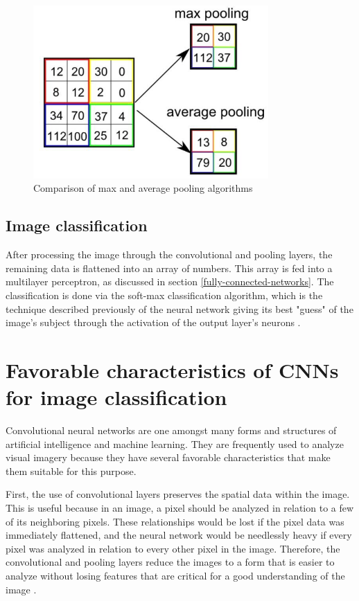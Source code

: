 \documentclass[12pt,a4paper,notitlepage]{article}
\begin{document}
\begin{figure}[htbp]
	\centering
		\includegraphics[width=0.80\textwidth]{images/pooling.jpg}
	\caption{Comparison of max and average pooling algorithms \cite{saha_comprehensive_2018}}
	\label{fig:pooling}
\end{figure}

\subsection{Image classification}
After processing the image through the convolutional and pooling layers, the remaining data is flattened into an array of numbers. This array is fed into a multilayer perceptron, as discussed in section \ref{fully-connected-networks}. The classification is done via the soft-max classification algorithm, which is the technique described previously of the neural network giving its best "guess" of the image's subject through the activation of the output layer's neurons \cite{rosebrock_softmax_2016}.

\section{Favorable characteristics of CNNs for image classification}
Convolutional neural networks are one amongst many forms and structures of artificial intelligence and machine learning. They are frequently used to analyze visual imagery because they have several favorable characteristics that make them suitable for this purpose.

First, the use of convolutional layers preserves the spatial data within the image. This is useful because in an image, a pixel should be analyzed in relation to a few of its neighboring pixels. These relationships would be lost if the pixel data was immediately flattened, and the neural network would be needlessly heavy if every pixel was analyzed in relation to every other pixel in the image. Therefore, the convolutional and pooling layers reduce the images to a form that is easier to analyze without losing features that are critical for a good understanding of the image \cite{saha_comprehensive_2018}.
\end{document}

